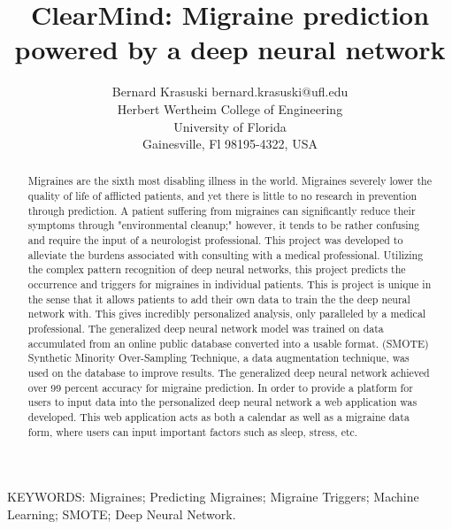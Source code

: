 \documentclass[twoside,11pt]{article}
\begin{document}
\title{ClearMind: Migraine prediction powered by a deep neural network}

\author{\name Bernard Krasuski \email bernard.krasuski@ufl.edu \\
       \addr Herbert Wertheim College of Engineering\\
       University of Florida\\
       Gainesville, Fl 98195-4322, USA
      }


\maketitle

\begin{abstract}%
Migraines are the sixth most disabling illness in the world. Migraines severely lower the quality of life of afflicted patients, and yet there is little to no research in prevention through prediction. A patient suffering from migraines can significantly reduce their symptoms through "environmental cleanup;" however, it tends to be rather confusing and require the input of a neurologist professional. This project was developed to alleviate the burdens associated with consulting with a medical professional. Utilizing the complex pattern recognition of deep neural networks, this project predicts the occurrence and triggers for migraines in individual patients. This is project is unique in the sense that it allows patients to add their own data to train the the deep neural network with. This gives incredibly personalized analysis, only paralleled by a medical professional. The generalized deep neural network model was trained on data accumulated from an online public database converted into a usable format. (SMOTE) Synthetic Minority Over-Sampling Technique, a data augmentation technique, was used on the database to improve results. The generalized deep neural network achieved over 99 percent accuracy for migraine prediction. In order to provide a platform for users to input data into the personalized deep neural network a web application was developed. This web application acts as both a calendar as well as a migraine data form, where users can input important factors such as sleep, stress, etc.

\end{abstract}

\begin{keywords}
KEYWORDS: Migraines; Predicting Migraines; Migraine Triggers; Machine Learning; SMOTE; Deep Neural Network.
\end{keywords}
\end{document}
